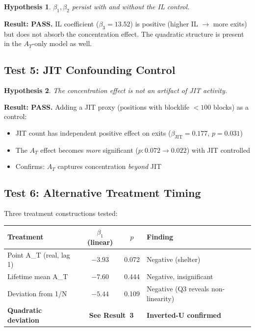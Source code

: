 \documentclass[11pt,a4paper]{article}
\newtheorem{hypothesis}{Hypothesis}
\begin{document}
\begin{hypothesis}
$\beta_1, \beta_2$ persist with and without the IL control.
\end{hypothesis}

\textbf{Result: PASS.} IL coefficient ($\beta_3 = 13.52$) is positive
(higher IL $\to$ more exits) but does not absorb the concentration effect.
The quadratic structure is present in the $A_T$-only model as well.

\subsection{Test 5: JIT Confounding Control}

\begin{hypothesis}
The concentration effect is not an artifact of JIT activity.
\end{hypothesis}

\textbf{Result: PASS.} Adding a JIT proxy (positions with blocklife $< 100$
blocks) as a control:
\begin{itemize}[nosep]
  \item JIT count has independent positive effect on exits
        ($\beta_{\text{JIT}} = 0.177$, $p = 0.031$)
  \item The $A_T$ effect becomes \emph{more} significant ($p: 0.072 \to
        0.022$) with JIT controlled
  \item Confirms: $A_T$ captures concentration \emph{beyond} JIT
\end{itemize}

\subsection{Test 6: Alternative Treatment Timing}

Three treatment constructions tested:

\begin{center}
\begin{tabular}{lccl}
\toprule
Treatment & $\beta_1$ (linear) & $p$ & Finding \\
\midrule
Point A\_T (real, lag 1) & $-3.93$ & 0.072 & Negative (shelter) \\
Lifetime mean A\_T & $-7.60$ & 0.444 & Negative, insignificant \\
Deviation from 1/N & $-5.44$ & 0.109 & Negative (Q3 reveals non-linearity) \\
\textbf{Quadratic deviation} & \multicolumn{2}{c}{\textbf{See Result~3}} &
  \textbf{Inverted-U confirmed} \\
\bottomrule
\end{tabular}
\end{center}
\end{document}
